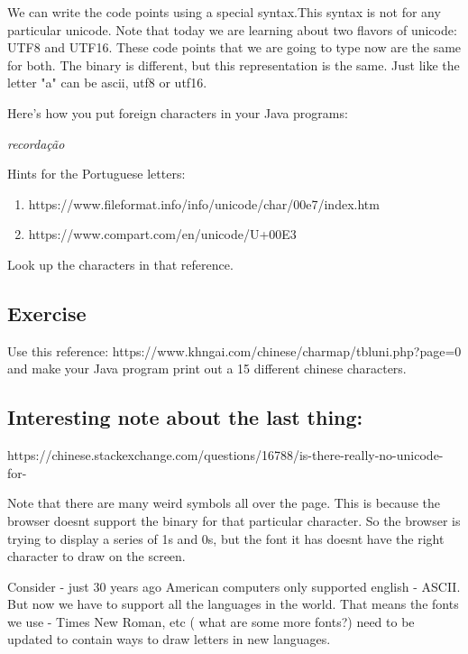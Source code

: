 \documentclass[12pt]{article}
\begin{document}
We can write the code points using a special syntax.This syntax is not for any
particular unicode. Note that today we are learning about two flavors of
unicode: UTF8 and UTF16. These code points that we are going to type now are the
same for both. The binary is different, but this representation is the same.
Just like the letter "a" can be ascii, utf8 or utf16.

Here's how you put foreign characters in your Java programs:


\begin{center}
\textit{recordação} 
\end{center}

Hints for the Portuguese letters:
\begin{enumerate}
\item https://www.fileformat.info/info/unicode/char/00e7/index.htm
\item https://www.compart.com/en/unicode/U+00E3
\end{enumerate}

Look up the characters in that reference.




\subsection{Exercise}
Use this reference: https://www.khngai.com/chinese/charmap/tbluni.php?page=0
and make your Java program print out a 15 different chinese characters.

\subsection{Interesting note about the last thing:}
https://chinese.stackexchange.com/questions/16788/is-there-really-no-unicode-for-%

Note that there are many weird symbols all over the page. This is because the
browser doesnt support the binary for that particular character. So the browser
is trying to display a series of 1s and 0s, but the font it has doesnt have the
right character to draw on the screen.

Consider - just 30 years ago American computers only supported english - ASCII.
But now we have to support all the languages in the world. That means the fonts
we use - Times New Roman, etc ( what are some more fonts?) need to be updated to
contain ways to draw letters in new languages.
\end{document}

